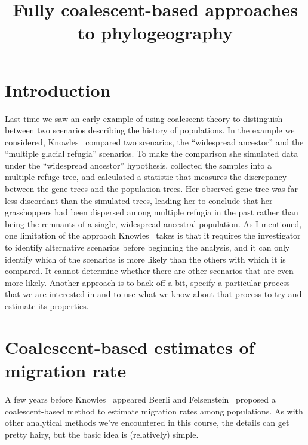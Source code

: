 \documentclass[12pt]{article}
\title{Fully coalescent-based approaches to phylogeography}
\begin{document}
\maketitle

\thispagestyle{first}

\section*{Introduction}

Last time we saw an early example of using coalescent theory to
distinguish between two scenarios describing the history of
populations. In the example we considered, Knowles~\cite{Knowles-2001}
compared two scenarios, the ``widespread ancestor'' and the ``multiple
glacial refugia'' scenarios. To make the comparison she simulated data
under the ``widespread ancestor'' hypothesis, collected the samples
into a multiple-refuge tree, and calculated a statistic that measures
the discrepancy between the gene trees and the population trees. Her
observed gene tree was far less discordant than the simulated trees,
leading her to conclude that her grasshoppers had been dispersed among
multiple refugia in the past rather than being the remnants of a
single, widespread ancestral population. As I mentioned, one
limitation of the approach Knowles~\cite{Knowles-2001} takes is that
it requires the investigator to identify alternative scenarios before
beginning the analysis, and it can only identify which of the
scenarios is more likely than the others with which it is compared. It
cannot determine whether there are other scenarios that are even more
likely. Another approach is to back off a bit, specify a particular
process that we are interested in and to use what we know about that
process to try and estimate its properties.

\section*{Coalescent-based estimates of migration rate}

A few years before Knowles~\cite{Knowles-2001} appeared Beerli and
Felsenstein~\cite{Beerli-Felsenstein-1999,Beerli-Felsenstein-2001}
proposed a coalescent-based method to estimate migration rates among
populations. As with other analytical methods we've encountered in
this course, the details can get pretty hairy, but the basic idea is
(relatively) simple.
\end{document}
